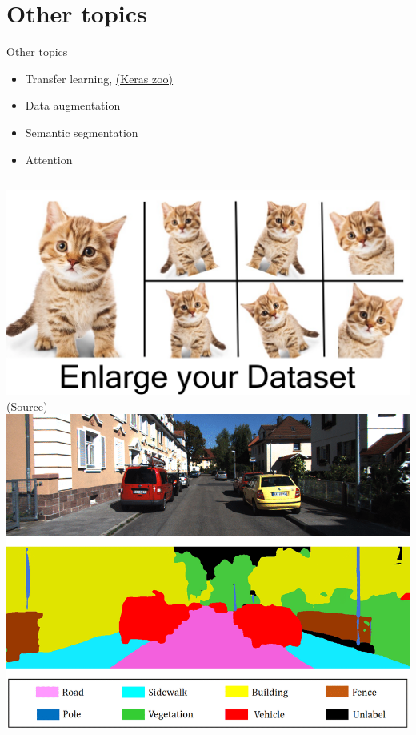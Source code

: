 \documentclass[10pt,compress]{beamer} %
\begin{document}
\section{Other topics}
\begin{frame}{Other topics}
	\begin{itemize}
		\item Transfer learning, \href{https://keras.io/api/applications/}{(Keras zoo)}
		\item Data augmentation
        \item Semantic segmentation
        \item Attention
	\end{itemize}

    \begin{columns}
	    \centering \includegraphics[width=\linewidth]{figs/augmentation.png}\\
	    \scriptsize\href{https://medium.com/nanonets/how-to-use-deep-learning-when-you-have-limited-data-part-2-data-augmentation-c26971dc8ced}{(Source)}\\
	    \includegraphics[width=\linewidth]{figs/semantic.png}\\

\end{columns}
\end{frame}
\end{document}

